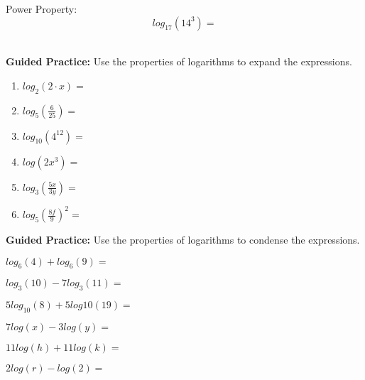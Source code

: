 \documentclass[12pt]{article}
\begin{document}
Power Property: $$log_{17}(14^3)=$$ \\

\hrulefill

\textbf{Guided Practice:} Use the properties of logarithms to expand the expressions.\\

\begin{multicols}{2}
\begin{enumerate}
	\setlength\itemsep{1cm}

	\item  $log_{2}(2 \cdot x)=$\\
	
	\item $log_{5}\left( \frac{6}{25} \right)=$\\
	
	\item $log_{10} \left(4^{12} \right) =$\\
	
	\item $log(2x^3)=$\\
	
	\item $log_{3}\left(\frac{5x}{3y}\right)=$\\
	
	\item $log_{5}\left(\frac{8f}{9}\right)^2=$\\

\end{enumerate}
\end{multicols}

\clearpage

\textbf{Guided Practice:} Use the properties of logarithms to condense the expressions.\\


\begin{enumerate}
\begin{multicols}{2}
	\setlength\itemsep{1cm}
	
	\item $log_{6}(4) + log_{6}(9)=$
	
	\item $log_{3}(10) - 7log_{3}(11)=$
	
	\item $5log_{10}(8) + 5log{10}(19)=$
	
	\item $7log(x) - 3log(y) = $
	
	\item $11log(h) + 11log(k) = $
	
	\item $2log(r) - log(2) = $
\end{multicols}
\end{enumerate}
\end{document}

